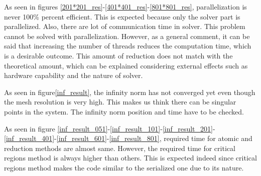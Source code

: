 \documentclass{article}
\begin{document}
As seen in figures \ref{201*201_res}-\ref{401*401_res}-\ref{801*801_res}, parallelization is never 100\% percent efficient. This is expected because only the solver part is parallelized. Also, there are lot of communication time in solver. This problem cannot be solved with parallelization. However, as a general comment, it can be said that increasing the number of threads reduces the computation time, which is a desirable outcome. This amount of reduction does not match with the theoretical amount, which can be explained considering external effects such as hardware capability and the nature of solver. 

As seen in figure\ref{inf_result}, the infinity norm has not converged yet even though the mesh resolution is very high. This makes us think there can be singular points in the system. The infinity norm position and time have to be checked.   

As seen in figure \ref{inf_result_051}-\ref{inf_result_101}-\ref{inf_result_201}-\ref{inf_result_401}-\ref{inf_result_601}-\ref{inf_result_801}, required time for atomic and reduction methods are almost same. However, the required time for critical regions method is always higher than others. This is expected indeed since critical regions method makes the code similar to the serialized one due to its nature. 

\clearpage
\printbibliography
\end{document}
